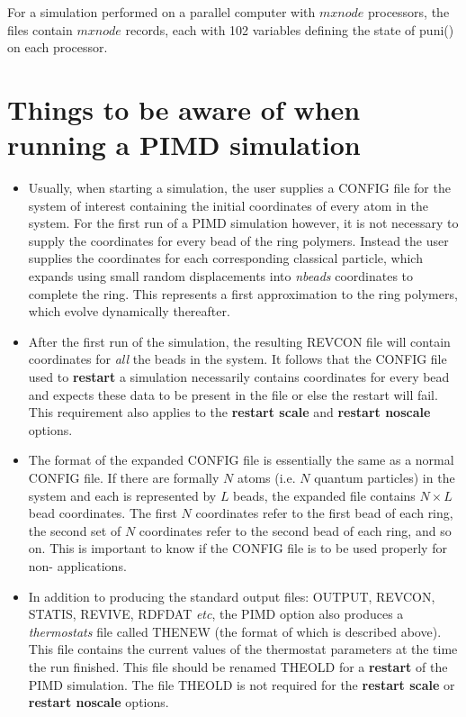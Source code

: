 For a simulation performed on a parallel computer with $mxnode$
processors, the files contain $mxnode$ records, each with 102
variables defining the state of {\sc puni()} on each processor.

\section{Things to be aware of when running a PIMD simulation}

\begin{itemize}
\item Usually, when starting a \DD{} simulation, the user supplies a
  CONFIG file for the system of interest containing the initial
  coordinates of every atom in the system. For the first run of a PIMD
  simulation however, it is not necessary to supply the coordinates
  for every bead of the ring polymers. Instead the user supplies the
  coordinates for each corresponding classical particle, which \DD{}
  expands using small random displacements into {\em nbeads} coordinates
  to complete the ring. This represents a first approximation to the
  ring polymers, which evolve dynamically thereafter.

\item After the first run of the simulation, the resulting REVCON file
  will contain coordinates for {\em all} the beads in the system. It
  follows that the CONFIG file used to {\bf restart} a simulation
  necessarily contains coordinates for every bead and \DD{} expects
  these data to be present in the file or else the restart will
  fail. This requirement also applies to the {\bf restart scale} and
  {\bf restart noscale} options.

\item The format of the expanded CONFIG file is essentially the same
  as a normal CONFIG file. If there are formally $N$ atoms (i.e. $N$
  quantum particles) in the system and each is represented by $L$
  beads, the expanded file contains $N\times L$ bead coordinates. The
  first $N$ coordinates refer to the first bead of each ring, the
  second set of $N$ coordinates refer to the second bead of each ring,
  and so on. This is important to know if the CONFIG file is to be
  used properly for non-\DD{} applications.

\item In addition to producing the standard output files: OUTPUT,
  REVCON, STATIS, REVIVE, RDFDAT {\em etc}, the PIMD option also
  produces a {\em thermostats} file called THENEW 
  (the format of which is described above). This file contains the
  current values of the thermostat parameters at the time the run
  finished. This file should be renamed THEOLD  for
  a {\bf restart} of the PIMD simulation. The file THEOLD is not
  required for the {\bf restart scale} or {\bf restart noscale}
  options.


\end{itemize}
